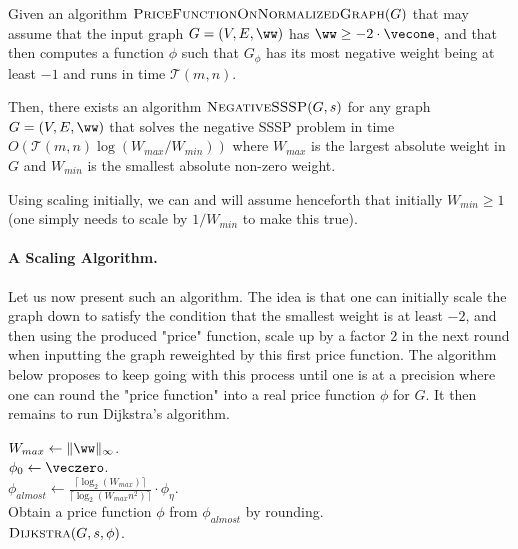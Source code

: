 \begin{theorem}\label{thm:reduceToNormalized}
Given an algorithm $\textsc{PriceFunctionOnNormalizedGraph}(G)$ that may assume that the input graph $G=(V,E,\ww)$ has $\ww \geq -2 \cdot \vecone$, and that then computes a function $\phi$ such that $G_{\phi}$ has its most negative weight being at least $-1$ and runs in time $\mathcal{T}(m, n)$. 

Then, there exists an algorithm $\textsc{NegativeSSSP}(G,s)$ for any graph $G=(V,E, \ww)$ that solves the negative SSSP problem in time $O(\mathcal{T}(m, n) \log(W_{max}/W_{min}))$ where $W_{max}$ is the largest absolute weight in $G$ and $W_{min}$ is the smallest absolute non-zero weight.
\end{theorem}

Using scaling initially, we can and will assume henceforth that initially $W_{min} \geq 1$ (one simply needs to scale by $1/W_{min}$ to make this true).

\paragraph{A Scaling Algorithm.} Let us now present such an algorithm. The idea is that one can initially scale the graph down to satisfy the condition that the smallest weight is at least $-2$, and then using the produced "price" function, scale up by a factor $2$ in the next round when inputting the graph reweighted by this first price function. The algorithm below proposes to keep going with this process until one is at a precision where one can round the "price function" into a real price function $\phi$ for $G$. It then remains to run Dijkstra's algorithm.

\begin{algorithm}
$W_{max} \gets \|\ww\|_{\infty}$.\\
$\phi_0 \gets \veczero$.\\
$\phi_{almost} \gets \frac{\lceil \log_2(W_{max})\rceil}{\lceil \log_2(W_{max} n^2)\rceil} \cdot \phi_\eta$. \\
Obtain a price function $\phi$ from $\phi_{almost}$ by rounding.\\
\Return $\textsc{Dijkstra}(G, s, \phi)$.
\caption{$\textsc{NegativeSSSP}(G,s)$}
\end{algorithm}

